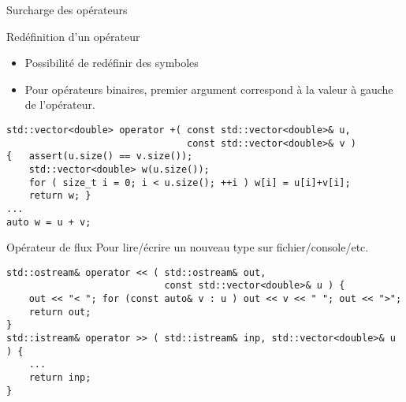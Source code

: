 \documentclass[handout,10pt]{beamer}
\begin{document}
\begin{frame}[fragile]{Surcharge des opérateurs}
\tiny
\begin{block}{Redéfinition d'un opérateur}
\begin{itemize}
\item Possibilité de redéfinir des symboles
\item Pour opérateurs binaires, premier argument correspond à la valeur à gauche de l'opérateur.
\end{itemize}
\begin{lstlisting}
std::vector<double> operator +( const std::vector<double>& u,
                                const std::vector<double>& v )
{   assert(u.size() == v.size());
    std::vector<double> w(u.size());
    for ( size_t i = 0; i < u.size(); ++i ) w[i] = u[i]+v[i];
    return w; }
...
auto w = u + v;
\end{lstlisting}
\end{block}

\begin{block}{Opérateur de flux}
Pour lire/écrire un nouveau type sur fichier/console/etc.
\begin{lstlisting}
std::ostream& operator << ( std::ostream& out, 
                            const std::vector<double>& u ) {
    out << "< "; for (const auto& v : u ) out << v << " "; out << ">";
    return out;
}
std::istream& operator >> ( std::istream& inp, std::vector<double>& u ) {
    ...
    return inp;
}
\end{lstlisting}
\end{block}
\end{frame}
\end{document}
